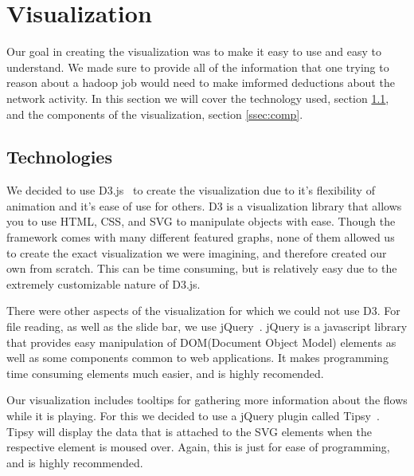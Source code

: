 \section{Visualization}
\label{sec:viz}
Our goal in creating the visualization was to make it easy to use and
easy to understand. We made sure to provide all of the information
that one trying to reason about a hadoop job would need to make
imformed deductions about the network activity. In this section we
will cover the technology used, section \ref{ssec:tech}, and the components of the
visualization, section \ref{ssec:comp}.

\subsection{Technologies}
\label{ssec:tech}
We decided to use D3.js~\cite{D3.js} to create the visualization due to
it's flexibility of animation and it's ease of use for others. D3 is a
visualization library that allows you to use HTML, CSS, and SVG to
manipulate objects with ease. Though the framework comes with many
different featured graphs, none of them allowed us to create the exact
visualization we were imagining, and therefore created our own from
scratch. This can be time consuming, but is relatively easy due to the
extremely customizable nature of D3.js.

There were other aspects of the visualization for which we could not
use D3. For file reading, as well as the slide bar, we use
jQuery~\cite{jQuery}. jQuery is a javascript library that provides
easy manipulation of DOM(Document Object Model) elements as well as
some components common to web applications. It makes programming time
consuming elements much easier, and is highly recomended.

Our visualization includes tooltips for gathering more information
about the flows while it is playing. For this we decided to use a
jQuery plugin called Tipsy~\cite{tipsy}. Tipsy will display the data
that is attached to the SVG elements when the respective element is
moused over. Again, this is just for ease of programming, and is
highly recommended.

